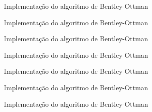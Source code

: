 \begin{frame}[fragile]{Implementação do algoritmo de Bentley-Ottman}
\end{frame}

\begin{frame}[fragile]{Implementação do algoritmo de Bentley-Ottman}
\end{frame}

\begin{frame}[fragile]{Implementação do algoritmo de Bentley-Ottman}
\end{frame}

\begin{frame}[fragile]{Implementação do algoritmo de Bentley-Ottman}
\end{frame}

\begin{frame}[fragile]{Implementação do algoritmo de Bentley-Ottman}
\end{frame}

\begin{frame}[fragile]{Implementação do algoritmo de Bentley-Ottman}
\end{frame}

\begin{frame}[fragile]{Implementação do algoritmo de Bentley-Ottman}
\end{frame}
